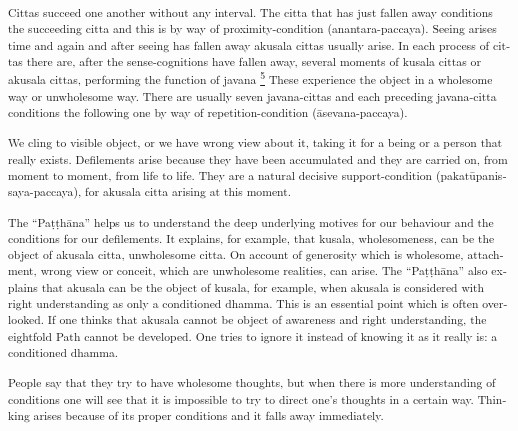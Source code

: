 \textsuperscript{\textenglish[variant=american]{Cittas succeed one
another without any interval. The citta that has just fallen away
conditions the succeeding citta and this is by way of
proximity-condition}\textdutch{
(}anantara-paccaya\textdutch{)}\textenglish[variant=american]{. Seeing
arises time and again and after seeing has fallen away akusala cittas
usually arise. In each process of cittas there are, after the
sense-cognitions have fallen away, several moments of kusala cittas or
akusala cittas, }\textdutch{performing the function of javana
\protect\hyperlink{sdfootnote5sym}{\textsuperscript{5}}}\textenglish[variant=american]{
These experience the object in a wholesome way or unwholesome way. There
are usually seven javana-cittas and each preceding javana-citta
conditions the following one by way of repetition-condition
}\textdutch{(ā}\textitalian{sevana-paccaya}\textdutch{)}.}

\textsuperscript{\textenglish[variant=american]{We cling to visible
object, or we have wrong view about it, taking it for a being or a
person that really exists. Defilements arise because they have been
accumulated and they are carried on, from moment to moment, from life to
life. They are a natural decisive support-condition}\textdutch{
(}pakat\textdutch{ū}\textitalian{panissaya-paccaya}\textdutch{)}\textenglish[variant=american]{,
for akusala citta arising at this moment. }}

\textsuperscript{\textenglish[variant=american]{The
}``Pa\textdutch{ṭṭhāna}'' \textenglish[variant=american]{helps us to
understand the deep underlying motives for our behaviour and the
conditions for our defilements. It explains, for example, that kusala,
wholesomeness, can be the object of akusala citta, unwholesome citta. On
account of generosity which is wholesome, attachment, wrong view or
conceit, which are unwholesome realities, can arise. The
}``Pa\textitalian{ṭṭ}h\textdanish{ā}na''
\textenglish[variant=american]{also explains that akusala can be the
object of kusala, for example, when akusala is considered with
}\textdutch{right understanding as only a conditioned dhamma.
}\textenglish[variant=american]{This is an essential point which is
often overlooked. If one thinks that akusala cannot be object of
awareness and right understanding, the eightfold Path cannot be
developed. }\textdutch{One tries to ignore it instead of knowing it as
it really is: a conditioned dhamma. }}

\textsuperscript{\textdutch{People say that they try to have wholesome
thoughts, but when there is more understanding of conditions one will
see that it is impossible to try to direct one's thoughts in a certain
way. Thinking arises because of its proper conditions and it falls away
immediately.}}

